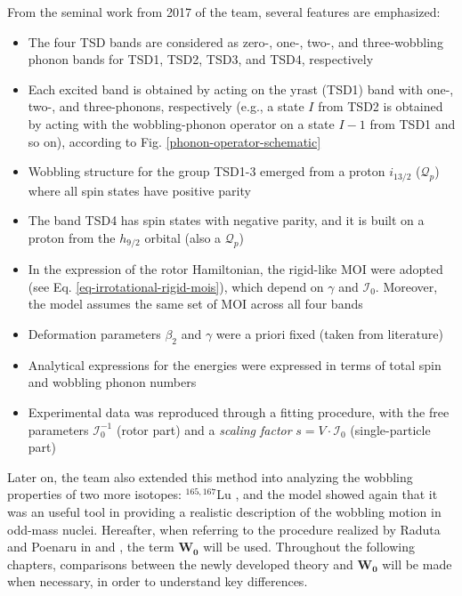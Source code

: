 From the seminal work from 2017 of the team, several features are emphasized:
\begin{itemize}
    \item The four TSD bands are considered as zero-, one-, two-, and three-wobbling phonon bands for TSD1, TSD2, TSD3, and TSD4, respectively
    \item Each excited band is obtained by acting on the yrast (TSD1) band with one-, two-, and three-phonons, respectively (e.g., a state $I$ from TSD2 is obtained by acting with the wobbling-phonon operator on a state $I-1$ from TSD1 and so on), according to Fig. \ref{phonon-operator-schematic}
    \item Wobbling structure for the group TSD1-3 emerged from a proton $i_{13/2}$ ($\mathcal{Q}_p$) where all spin states have positive parity
    \item The band TSD4 has spin states with negative parity, and it is built on a proton from the $h_{9/2}$ orbital (also a $\mathcal{Q}_p$)
    \item In the expression of the rotor Hamiltonian, the rigid-like MOI were adopted (see Eq. \ref{eq-irrotational-rigid-mois}), which depend on $\gamma$ and $\mathcal{I}_0$. Moreover, the model assumes the same set of MOI across all four bands
    \item Deformation parameters $\beta_2$ and $\gamma$ were a priori fixed (taken from literature)
    \item Analytical expressions for the energies were expressed in terms of total spin and wobbling phonon numbers
    \item Experimental data was reproduced through a fitting procedure, with the free parameters $\mathcal{I}_0^{-1}$ (rotor part) and a \emph{scaling factor} $s=V\cdot \mathcal{I}_0$ (single-particle part)
\end{itemize}

Later on, the team also extended this method into analyzing the wobbling properties of two more isotopes: $^{165,167}$Lu \cite{raduta2018wobbling}, and the model showed again that it was an useful tool in providing a realistic description of the wobbling motion in odd-mass nuclei. Hereafter, when referring to the procedure realized by Raduta and Poenaru in \cite{raduta2017semiclassical} and \cite{raduta2018wobbling}, the term $\mathbf{W_0}$ will be used. Throughout the following chapters, comparisons between the newly developed theory and $\mathbf{W_0}$ will be made when necessary, in order to understand key differences.

